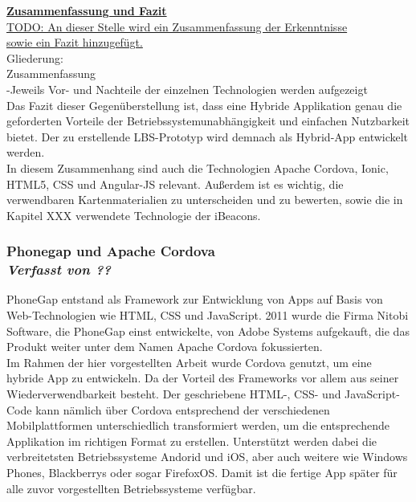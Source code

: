 \textbf{\underline{Zusammenfassung und Fazit}}\\





\underline{TODO: An dieser Stelle wird ein Zusammenfassung der Erkenntnisse }\\
\underline{sowie ein Fazit hinzugefügt.}
\\Gliederung:
\\Zusammenfassung
\\-Jeweils Vor- und Nachteile der einzelnen Technologien werden aufgezeigt
\\
Das Fazit dieser Gegenüberstellung ist, dass eine Hybride Applikation genau die geforderten Vorteile der Betriebssystemunabhängigkeit und einfachen Nutzbarkeit bietet. Der zu erstellende LBS-Prototyp wird demnach als Hybrid-App entwickelt werden.
\\
In diesem Zusammenhang sind auch die Technologien Apache Cordova, Ionic, HTML5, CSS und Angular-JS relevant. Außerdem ist es wichtig, die verwendbaren Kartenmaterialien zu unterscheiden und zu bewerten, sowie die in Kapitel XXX verwendete Technologie der iBeacons.

\subsubsection[Phonegap und Apache Cordova]{Phonegap und Apache Cordova
 \\ \textnormal{\small{\textit {Verfasst von ??}}}}

PhoneGap entstand als Framework zur Entwicklung von Apps auf Basis von Web-Technologien wie HTML, CSS und JavaScript. 2011 wurde die Firma Nitobi Software, die PhoneGap einst entwickelte, von Adobe Systems aufgekauft, die das Produkt weiter unter dem Namen Apache Cordova fokussierten. \\
Im Rahmen der hier vorgestellten Arbeit wurde Cordova genutzt, um eine hybride App zu entwickeln. Da der Vorteil des Frameworks vor allem aus seiner Wiederverwendbarkeit besteht. Der geschriebene HTML-, CSS- und JavaScript-Code kann nämlich über Cordova entsprechend der verschiedenen Mobilplattformen unterschiedlich transformiert werden, um die entsprechende Applikation im richtigen Format zu erstellen. Unterstützt werden dabei die verbreitetsten Betriebssysteme Andorid und iOS, aber auch weitere wie Windows Phones, Blackberrys oder sogar FirefoxOS. Damit ist die fertige App später für alle zuvor vorgestellten Betriebssysteme verfügbar.


